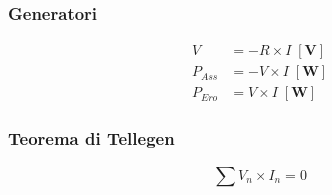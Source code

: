 \documentclass[10pt]{article}
\newcommand{\unit}[1]{\left[\mathbf{#1}\right]}
\begin{document}
        \begin{minipage}[t]{.3\textwidth}
            \vspace{-\baselineskip}

            \subsubsection*{Generatori}
            
                \begin{minipage}[t]{.2\textwidth}
                    \vspace{-\baselineskip}

                    
                \end{minipage}
                \hfill
                \begin{minipage}[t]{.8\textwidth}
                    \vspace{-1.5\baselineskip}

                    \begin{align*}
                        V &= - R \times I \; \unit{V}\\
                        P_{Ass} &= - V \times I \; \unit{W}\\
                        P_{Ero} &= V \times I \; \unit{W}
                    \end{align*}
                \end{minipage}

        \end{minipage}
        \hfill
        \begin{minipage}[t]{.3\textwidth}
            \vspace{-\baselineskip}

            \subsubsection*{Teorema di Tellegen}

                \[
                    \sum V_n \times I_n = 0
                \]

            \vspace{-\baselineskip}



        \end{minipage}
\end{document}

